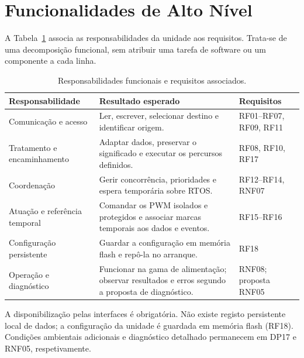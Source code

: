 \section{Funcionalidades de Alto Nível}

A Tabela~\ref{tab:funcoes-arquitetura} associa as responsabilidades da
unidade aos requisitos. Trata-se de uma decomposição funcional, sem
atribuir uma tarefa de software ou um componente a cada linha.

\begin{table}[htbp]
    \centering\small{}
    \renewcommand{\arraystretch}{1.2}
    \caption{Responsabilidades funcionais e requisitos associados.}
    \label{tab:funcoes-arquitetura}
    \begin{tabularx}{\textwidth}{@{}>{\raggedright\arraybackslash}p{}>{\raggedright\arraybackslash}X>{\raggedright\arraybackslash}p{}@{}}
        \toprule
\rowcolor{LasetTint}
        Responsabilidade & Resultado esperado & Requisitos \\
        \midrule
        Comunicação e acesso & Ler, escrever, selecionar destino e identificar origem. & RF01--RF07, RF09, RF11 \\
        \addlinespace
        Tratamento e encaminhamento & Adaptar dados, preservar o significado e executar os percursos definidos. & RF08, RF10, RF17 \\
        \addlinespace
        Coordenação & Gerir concorrência, prioridades e espera temporária sobre RTOS. & RF12--RF14, RNF07 \\
        \addlinespace
        Atuação e referência temporal & Comandar os PWM isolados e protegidos e associar marcas temporais aos dados e eventos. & RF15--RF16 \\
        \addlinespace
        Configuração persistente & Guardar a configuração em memória flash e repô-la no arranque. & RF18 \\
        \addlinespace
        Operação e diagnóstico & Funcionar na gama de alimentação; observar resultados e erros segundo a proposta de diagnóstico. & RNF08; proposta RNF05 \\
        \bottomrule
    \end{tabularx}
\end{table}

A disponibilização pelas interfaces é obrigatória. Não existe registo
persistente local de dados; a configuração da unidade é guardada em
memória flash (RF18). Condições ambientais adicionais e diagnóstico
detalhado permanecem em DP17 e RNF05, respetivamente.

